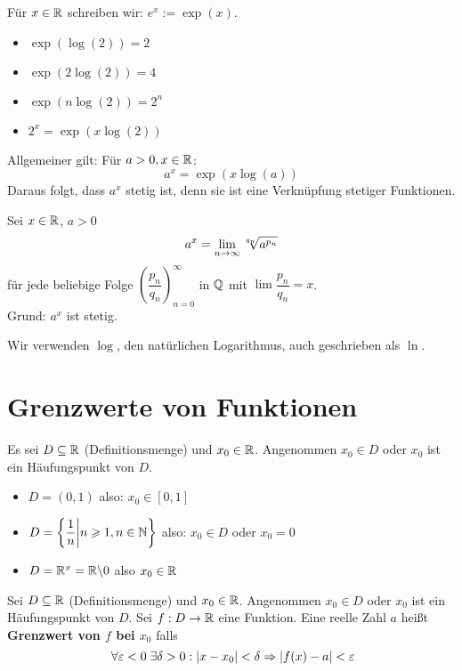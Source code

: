 \documentclass[main.tex]{subfiles}
\begin{document}
\begin{Definition}
  Für $x \in \mathbb{R}$ schreiben wir: $e^x := \exp(x)$.
  \begin{itemize}
    \item $\exp(\log(2)) = 2$
    \item $\exp(2\log(2)) = 4$
    \item $\exp(n\log(2)) = 2^n$
    \item $2^x = \exp(x\log(2))$
  \end{itemize}
  Allgemeiner gilt: Für $a>0, x\in \mathbb{R}$:
  $$a^x = \exp(x\log(a))$$
  Daraus folgt, dass $a^x$ stetig ist, denn sie ist eine Verknüpfung stetiger Funktionen.
\end{Definition}

\begin{Bemerkung}
  Sei $x \in \mathbb{R}$, $a >0$
  $$a^x = \lim \limits_{n \to \infty} \sqrt[q_n]{a^{p_n}}$$
  für jede beliebige Folge $\left(\dfrac{p_n}{q_n}\right)_{n=0}^\infty$ in $\mathbb{Q}$ mit $\lim \dfrac{p_n}{q_n} = x$.\\
  Grund: $a^x$ ist stetig.
\end{Bemerkung}

\begin{Bemerkung}
  Wir verwenden $\log$, den natürlichen Logarithmus, auch geschrieben als $\ln$.
\end{Bemerkung}


\section{Grenzwerte von Funktionen}

Es sei $D \subseteq \mathbb{R}$ (Definitionsmenge) und $x_0 \in \mathbb{R}$. Angenommen $x_0 \in D$ oder $x_0$ ist ein Häufungspunkt von $D$.

\begin{Beispiel}[typisch]
  \begin{itemize}
    \item $D = (0,1)$ also: $x_0 \in [0,1]$
    \item $D = \left\{\dfrac{1}{n} \middle| n \geqslant 1, n\in \mathbb{N} \right\}$ also: $x_0 \in D$ oder $x_0 = 0$
    \item $D = \mathbb{R}^x = \mathbb{R}\backslash 0$ also $x_0 \in \mathbb{R}$
  \end{itemize}
\end{Beispiel}

\begin{Definition}[Grenzwert]
  Sei $D \subseteq \mathbb{R}$ (Definitionsmenge) und $x_0 \in \mathbb{R}$. Angenommen $x_0 \in D$ oder $x_0$ ist ein Häufungspunkt von $D$. Sei $f: D \to \mathbb{R}$ eine Funktion. Eine reelle Zahl $a$ heißt \textbf{Grenzwert von $f$ bei $x_0$} falls
  $$\;\forall \varepsilon < 0 \;\exists \delta > 0 : |x-x_0| < \delta \Rightarrow |f(x) - a| < \varepsilon$$
\end{Definition}
\end{document}

